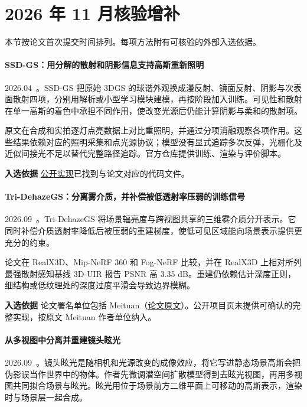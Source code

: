 \section{2026 年 11 月核验增补}

本节按论文首次提交时间排列。每项方法附有可核验的外部入选依据。

\paragraph{SSD-GS：用分解的散射和阴影信息支持高斯重新照明}
2026.04~\cite{2604_13333}。SSD-GS 把原始 3DGS 的球谐外观换成漫反射、镜面反射、阴影与次表面散射四项，分别用解析或小型学习模块建模，再按阶段加入训练。可见性和散射在单一高斯的着色中承担不同作用，使改变光源后仍能计算阴影与柔和的散射项。

原文在合成和实拍逐灯点亮数据上对比重照明，并通过分项消融观察各项作用。这些结果依赖对应的照明采集和点光源协议；模型没有显式追踪多次反弹，光栅化及近似间接光不足以替代完整路径追踪。官方仓库提供训练、渲染与评价脚本。

\textbf{入选依据} \href{https://github.com/irisfreesiri/ssd-gs}{公开实现}已找到与论文对应的代码文件。

\paragraph{Tri-DehazeGS：分离雾介质，并补偿被低透射率压弱的训练信号}
2026.09~\cite{2609_11223}。Tri-DehazeGS 将场景辐亮度与跨视图共享的三维雾介质分开表示。它同时补偿介质透射率降低后被压弱的重建梯度，使低可见区域能向场景表示提供更充分的约束。

论文在 RealX3D、Mip-NeRF 360 和 Fog-NeRF 比较，并在 RealX3D 上相对所列最强散射感知基线 3D-UIR 报告 PSNR 高 3.35 dB。重建仍依赖估计深度正则，细结构或低纹理处的深度过度平滑会导致边界模糊。

\textbf{入选依据} 论文署名单位包括 Meituan（\href{https://arxiv.org/abs/2609.11223}{论文原文}）。公开项目页未提供可确认的完整实现，按原文 Meituan 作者单位纳入。

\paragraph{从多视图中分离并重建镜头眩光}
2026.09~\cite{2609_39527}。镜头眩光是随相机和光源改变的成像效应，将它写进静态场景高斯会把伪影误当作世界中的物体。作者先微调潜空间扩散模型得到去眩光视图，再用多视图共同拟合场景与眩光。眩光用位于场景前方二维平面上可移动的高斯表示，渲染时与场景层一起合成。

